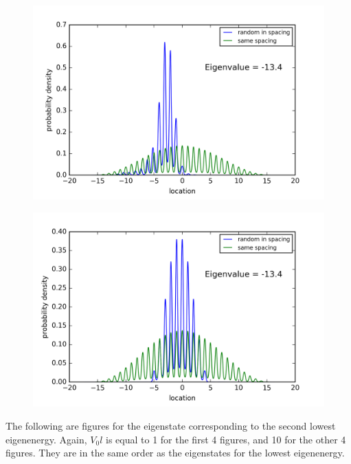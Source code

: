 \begin{figure}[!htbh]
\centering
\begin{minipage}{.45\textwidth}
  \centering
  \includegraphics[width=1.1\linewidth]{Graphics/10_0_1th_Lowest_Rand1_1.png}
  \label{fig:Area10_1thlowestRand1.1}
\end{minipage}\qquad
\begin{minipage}{.45\textwidth}
  \centering
  \includegraphics[width=1.1\linewidth]{Graphics/10_0_1th_Lowest_Rand1_5.png}
  \label{fig:Area10_1thlowestRand1.5}
\end{minipage}
\end{figure}


The following are figures for the eigenstate corresponding to the second lowest eigenenergy. Again, $V_0l$ is equal to 1 for the first 4 figures, and 10 for the other 4 figures. They are in the same order as the eigenstates for the lowest eigenenergy.

